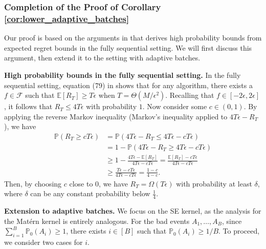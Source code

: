 \documentclass[10pt]{article}
\begin{document}
\subsubsection{Completion of the Proof of Corollary \ref{cor:lower_adaptive_batches}}
\label{app:proof_cor}
Our proof is based on the arguments in \citep{Scarlett17} that derives high probability bounds from expected regret bounds in the fully sequential setting. We will first discuss this argument, then extend it to the setting with adaptive batches.

\textbf{High probability bounds in the fully sequential setting. }
In the fully sequential setting,  equation (79) in \citep{Scarlett17} shows that for any algorithm, there exists a $f\in\mathcal{F}$ such that $\mathbb{E}[R_T] \geq T\epsilon$ when $T = \Theta( M/\epsilon^2 )$. Recalling that $f\in[-2\epsilon, 2\epsilon]$, it follows that $R_T \leq 4T\epsilon$ with probability $1$. 
Now consider some $c\in (0,1)$. By applying the reverse Markov inequality (Markov's inequality applied to $4T\epsilon - R_T$), we have
\begin{align}
    \mathbb{P}(R_T \geq c T\epsilon)
    & = \mathbb{P}(4T\epsilon - R_T \leq 4T\epsilon -  c T\epsilon) \label{eq:rev_1} \\
    & = 1 - \mathbb{P}(4T\epsilon - R_T \geq 4T\epsilon -  c T\epsilon) \\
    & \geq 1 - \frac{4T\epsilon - \mathbb{E}[R_T]}{4T\epsilon -  c T\epsilon}
    = \frac{\mathbb{E}[R_T] - cT\epsilon}{4T\epsilon -  c T\epsilon} \\
    & \geq \frac{T\epsilon - cT\epsilon}{4T\epsilon -  c T\epsilon}
    = \frac{1 - c}{4 -  c}. \label{eq:rev_2}
\end{align}
Then, by choosing $c$ close to $0$, we have $R_T = \Omega (T\epsilon)$ with probability at least $\delta$, where $\delta$ can be any constant probability below $\frac{1}{4}$.

\textbf{Extension to adaptive batches.} We focus on the SE kernel, as the analysis for the Mat\'ern kernel is entirely analogous.
For the bad events $A_1, \ldots, A_B$, since $\sum_{i=1}^B \mathbb{P}_0(A_i) \geq 1 $, there exists $i\in [B]$ such that $\mathbb{P}_0(A_i) \geq 1/B$. 
To proceed, we consider two cases for $i$.
\end{document}
